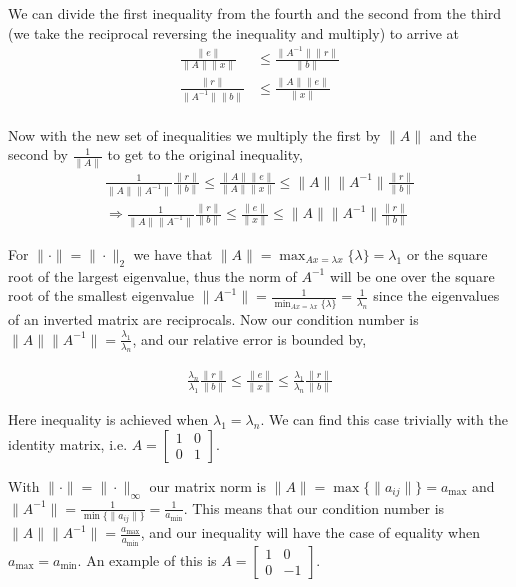 {We can divide the first inequality from the fourth and the second from
the third (we take the reciprocal reversing the inequality and multiply) to arrive at
\begin{align*}
\frac{\| e \|}{\| A \| \|x \|} &\le \frac{\| A^{-1} \| \| r \|}{\| b \|} \\
\frac{\| r \|}{\| A^{-1} \| \| b \|} &\le \frac{\| A \| \| e \|}{\| x \|} \\
\end{align*}

Now with the new set of inequalities we multiply the first by $\|
A \|$ and the second by $\frac{1}{\| A\|}$ to get to the original inequality,
\begin{align*}
\frac{1} {\|A\| \|A^{-1}\|} \frac{\|r\|} {\|b\|}
\le
\frac{\|A\|\|e\|}{\| A\|\|x\|}
\le
\|A\| \|A^{-1}\| \frac{\|r\|} {\|b\|} \\
\Rightarrow \frac{1} {\|A\| \|A^{-1}\|} \frac{\|r\|} {\|b\|}
\le
\frac{\|e\|}{\|x\|}
\le
\|A\| \|A^{-1}\| \frac{\|r\|} {\|b\|}
\end{align*}

For $\| \cdot \| = \| \cdot \|_2$ we have that
$\| A \| = \max_{Ax = \lambda x} \{\lambda\} = \lambda_1$ or
the square root of the largest eigenvalue, thus
the norm of $A^{-1}$ will be one over the square root of the smallest eigenvalue
$\| A^{-1} \| = \frac{1}{\min_{Ax = \lambda x} \{\lambda\}}
= \frac{1}{\lambda_n}$ since the eigenvalues of an
inverted matrix are reciprocals. Now our condition number is
$ \|A\| \|A^{-1}\| = \frac{\lambda_1}{\lambda_n}$, and our
relative error is bounded by,

\begin{align*}
\frac{\lambda_n}{\lambda_1}
 \frac{\|r\|} {\|b\|}
\le
\frac{\|e\|}{\|x\|}
\le
\frac{\lambda_1}{\lambda_n}
 \frac{\|r\|} {\|b\|}
\end{align*}

Here inequality is achieved when $\lambda_1 = \lambda_n$. We can find
this case trivially with the identity matrix, i.e.
$A = \begin{bmatrix} 1 & 0 \\ 0 & 1 \end{bmatrix}$.

With $\| \cdot \| = \| \cdot \|_{\infty}$ our matrix norm is
$\| A \| = \max\{ \|a_{ij}\| \} = a_{\max} $ and
$\| A^{-1} \| = \frac{1}{ \min\{\|a_{ij}\|\} } = \frac{1}{a_{\min}}$. This means that our
condition number is
$ \|A\| \|A^{-1}\| = \frac{a_{\max}}{a_{\min}} $, and our inequality will
have the case of equality when $a_{\max} = a_{\min}$. An example of this
is $A = \begin{bmatrix}1 & 0 \\ 0 & -1\end{bmatrix}$.

}
